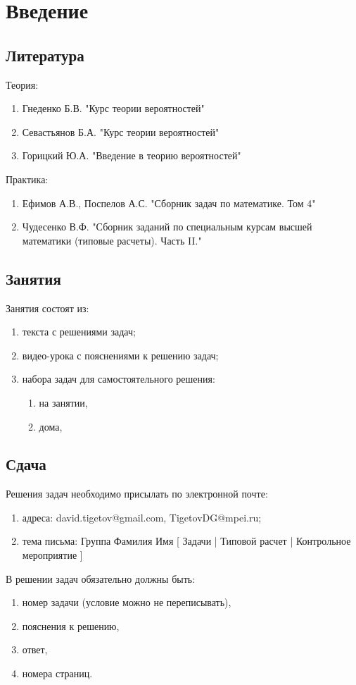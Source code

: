 \chapter{Введение}


\section*{Литература}

Теория:
\begin{enumerate}
    \item Гнеденко Б.В. "Курс теории вероятностей"
    \item Севастьянов Б.А. "Курс теории вероятностей"
    \item Горицкий Ю.А. "Введение в теорию вероятностей"
\end{enumerate}

Практика:
\begin{enumerate}
    \item Ефимов А.В., Поспелов А.С. "Сборник задач по математике. Том 4"
    \item Чудесенко В.Ф. "Сборник заданий по специальным курсам высшей математики (типовые расчеты). Часть II."
\end{enumerate}


\section*{Занятия}

Занятия состоят из:
\begin{enumerate}
    \item текста с решениями задач;
    \item видео-урока с пояснениями к решению задач;
    \item набора задач для самостоятельного решения:
    \begin{enumerate}
        \item на занятии,
        \item дома,
    \end{enumerate}
\end{enumerate}


\section*{Сдача}

Решения задач необходимо присылать по электронной почте:
\begin{enumerate}
    \item адреса: david.tigetov@gmail.com, TigetovDG@mpei.ru;
    \item тема письма: Группа Фамилия Имя [ Задачи | Типовой расчет | Контрольное мероприятие ]
\end{enumerate}

В решении задач обязательно должны быть:
\begin{enumerate}
    \item номер задачи (условие можно не переписывать),
    \item пояснения к решению,
    \item ответ,
    \item номера страниц.
\end{enumerate}
